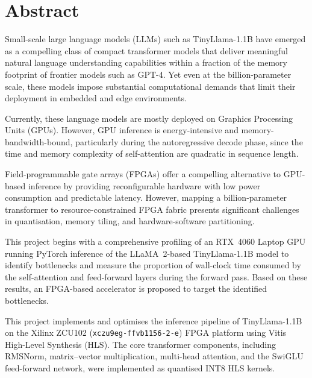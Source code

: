 %

\chapter*{Abstract}

Small-scale large language models (LLMs) such as TinyLlama-1.1B have
emerged as a compelling class of compact transformer models that deliver
meaningful natural language understanding capabilities within a fraction
of the memory footprint of frontier models such as GPT-4. Yet even at
the billion-parameter scale, these models impose substantial computational
demands that limit their deployment in embedded and edge environments.

Currently, these language models are mostly deployed on Graphics Processing
Units (GPUs). However, GPU inference is energy-intensive and
memory-bandwidth-bound, particularly during the autoregressive decode phase,
since the time and memory complexity of self-attention are quadratic in
sequence length.

Field-programmable gate arrays (FPGAs) offer a compelling alternative to
GPU-based inference by providing reconfigurable hardware with low power
consumption and predictable latency. However, mapping a billion-parameter
transformer to resource-constrained FPGA fabric presents significant
challenges in quantisation, memory tiling, and hardware-software
partitioning.

This project begins with a comprehensive profiling of an RTX~4060 Laptop GPU
running PyTorch inference of the LLaMA~2-based TinyLlama-1.1B model to
identify bottlenecks and measure the proportion of wall-clock time consumed
by the self-attention and feed-forward layers during the forward pass. Based
on these results, an FPGA-based accelerator is proposed to target the
identified bottlenecks.

This project implements and optimises the inference pipeline of TinyLlama-1.1B
on the Xilinx ZCU102 (\texttt{xczu9eg-ffvb1156-2-e}) FPGA platform using
Vitis High-Level Synthesis (HLS). The core transformer components, including
RMSNorm, matrix--vector multiplication, multi-head attention, and the SwiGLU
feed-forward network, were implemented as quantised INT8 HLS kernels.

